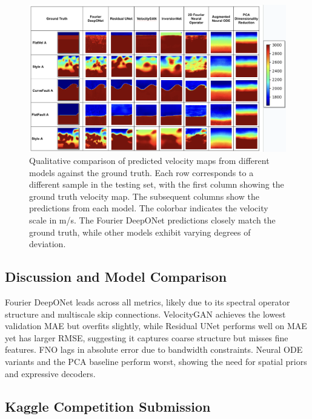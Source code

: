\documentclass{article}
\begin{document}
\begin{figure}
    \centering
    \includegraphics[width=\linewidth]{figures/qualitative_results.png}
    \caption{Qualitative comparison of predicted velocity maps from different models against the ground truth. Each row corresponds to a different sample in the testing set, with the first column showing the ground truth velocity map. The subsequent columns show the predictions from each model. The colorbar indicates the velocity scale in m/s. The Fourier DeepONet predictions closely match the ground truth, while other models exhibit varying degrees of deviation.}
    \label{fig:qualitative_results}
\end{figure}


\subsection{Discussion and Model Comparison}
Fourier DeepONet leads across all metrics, likely due to its spectral operator structure and multiscale skip connections. VelocityGAN achieves the lowest validation MAE but overfits slightly, while Residual UNet performs well on MAE yet has larger RMSE, suggesting it captures coarse structure but misses fine features. FNO lags in absolute error due to bandwidth constraints. Neural ODE variants and the PCA baseline perform worst, showing the need for spatial priors and expressive decoders.

\subsection{Kaggle Competition Submission}
\end{document}
